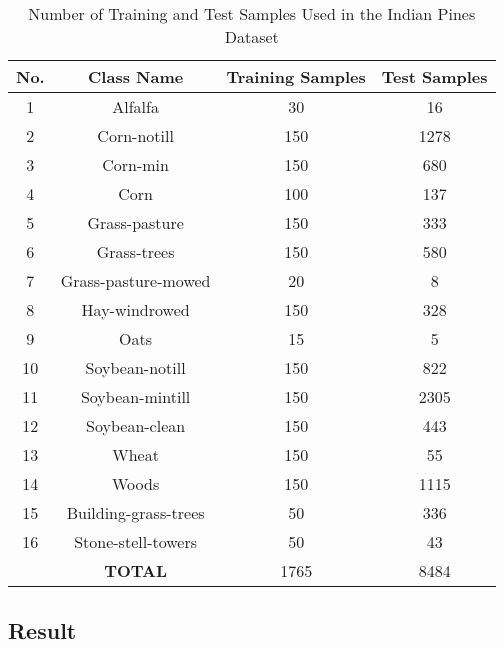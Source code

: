 \documentclass[conference]{IEEEtran}
\begin{document}
    
    \begin{table}[htbp]
    \caption{Number of Training and Test Samples Used in the Indian Pines Dataset}
    \begin{center}
    \begin{tabular}{cc|cc}
\hline
    \hline
    \textbf{No.} & \textbf{Class Name}& \textbf{Training Samples}& \textbf{Test Samples} \\
    \hline
    1  & Alfalfa              &   30 &   16 \\
    2  & Corn-notill          &  150 & 1278 \\
    3  & Corn-min             &  150 &  680 \\
    4  & Corn                 &  100 &  137 \\
    5  & Grass-pasture        &  150 &  333 \\
    6  & Grass-trees          &  150 &  580 \\
    7  & Grass-pasture-mowed  &   20 &    8 \\
    8  & Hay-windrowed        &  150 &  328 \\
    9  & Oats                 &   15 &    5 \\
    10 & Soybean-notill       &  150 &  822 \\
    11 & Soybean-mintill      &  150 & 2305 \\
    12 & Soybean-clean        &  150 &  443 \\
    13 & Wheat                &  150 &   55 \\
    14 & Woods                &  150 & 1115 \\
    15 & Building-grass-trees &   50 &  336 \\
    16 & Stone-stell-towers   &   50 &   43 \\
    \hline
       & \textbf{TOTAL}       & 1765 & 8484\\
    \hline
    \hline
    \end{tabular}
    \end{center}
    \label{tab:ipsample}
    \end{table}

\subsection{Result}
\end{document}
